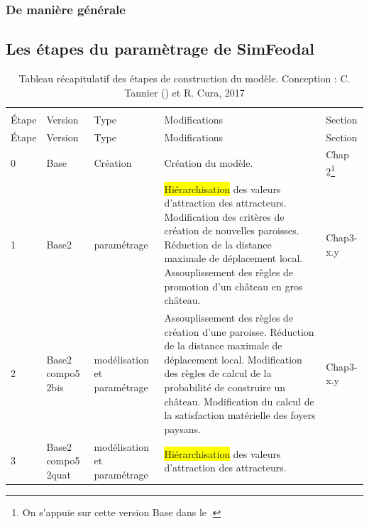 \documentclass[12pt, a4paper, oneside]{book}
\begin{document}
	\subsubsection{De manière générale}
	
	\subsection{Les étapes du paramètrage de SimFeodal}
	
	\pagebreak
	\begin{footnotesize}
		\begin{longtable}{ m{} m{}  m{}  m{}  m{}  }
			\caption{Tableau récapitulatif des étapes de construction du modèle. Conception : C. Tannier () et R. Cura, 2017}\\
			\label{table:etapes-construction}\\
			Étape & Version & Type & Modifications & Section\\
			\endfirsthead
			Étape & Version & Type & Modifications & Section\\
			\endhead			
			\hline
			0 & Base & Création & Création du modèle. \fixref{Cf. tableau 14 de Tannier 2017} & Chap 2\footnote{On s'appuie sur cette version \og Base\fg{} dans le \fixref{chapitre 2}.}\\
			\hline
			1 & Base2 & paramétrage & \colorbox{yellow}{Hiérarchisation} des valeurs d'attraction des attracteurs. \newline
			Modification des critères de création de nouvelles paroisses. \newline
			Réduction de la distance maximale de déplacement local. \newline
			Assouplissement des règles de promotion d'un château en gros château. & Chap3-x.y\\
			\hline
			2 & Base2 compo5 2bis & modélisation et paramétrage & Assouplissement des règles de création d'une paroisse.\newline
			Réduction de la distance maximale de déplacement local. \newline
			Modification des règles de calcul de la probabilité de construire un château.\newline
			Modification du calcul de la satisfaction matérielle des foyers paysans. & Chap3-x.y\\
			\hline
			3 & Base2 compo5 2quat & modélisation et paramétrage & \colorbox{yellow}{Hiérarchisation} des valeurs d'attraction des attracteurs. \newline

\end{longtable}
\end{footnotesize}
\end{document}
